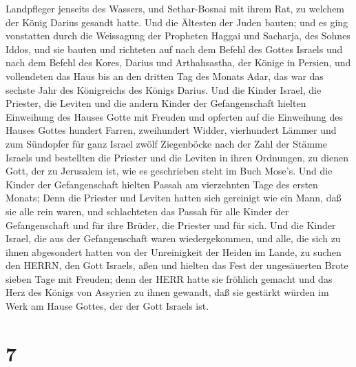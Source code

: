 Landpfleger jenseits des Wassers, und Sethar-Bosnai mit ihrem Rat, zu
welchem der König Darius gesandt hatte.  Und die Ältesten
der Juden bauten; und es ging vonstatten durch die Weissagung der
Propheten Haggai und Sacharja, des Sohnes Iddos, und sie bauten und
richteten auf nach dem Befehl des Gottes Israels und nach dem Befehl des
Kores, Darius und Arthahsastha, der Könige in Persien,  und
vollendeten das Haus bis an den dritten Tag des Monats Adar, das war das
sechste Jahr des Königreichs des Königs Darius.  Und die
Kinder Israel, die Priester, die Leviten und die andern Kinder der
Gefangenschaft hielten Einweihung des Hauses Gotte mit Freuden
 und opferten auf die Einweihung des Hauses Gottes hundert
Farren, zweihundert Widder, vierhundert Lämmer und zum Sündopfer für
ganz Israel zwölf Ziegenböcke nach der Zahl der Stämme Israels
 und bestellten die Priester und die Leviten in ihren
Ordnungen, zu dienen Gott, der zu Jerusalem ist, wie es geschrieben
steht im Buch Mose's.  Und die Kinder der Gefangenschaft
hielten Passah am vierzehnten Tage des ersten Monats;  Denn
die Priester und Leviten hatten sich gereinigt wie ein Mann, daß sie
alle rein waren, und schlachteten das Passah für alle Kinder der
Gefangenschaft und für ihre Brüder, die Priester und für sich.
 Und die Kinder Israel, die aus der Gefangenschaft waren
wiedergekommen, und alle, die sich zu ihnen abgesondert hatten von der
Unreinigkeit der Heiden im Lande, zu suchen den HERRN, den Gott Israels,
aßen  und hielten das Fest der ungesäuerten Brote sieben
Tage mit Freuden; denn der HERR hatte sie fröhlich gemacht und das Herz
des Königs von Assyrien zu ihnen gewandt, daß sie gestärkt würden im
Werk am Hause Gottes, der der Gott Israels ist.

\hypertarget{section-6}{%
\section{7}\label{section-6}}

